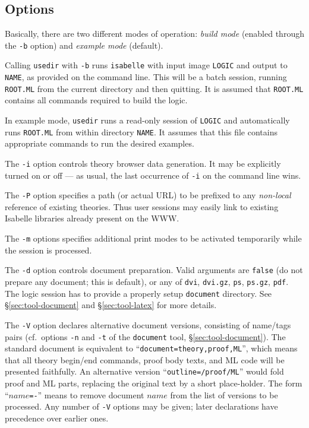 \subsection*{Options}

Basically, there are two different modes of operation: \emph{build mode}
(enabled through the \texttt{-b} option) and \emph{example mode} (default).

Calling \texttt{usedir} with \texttt{-b} runs \texttt{isabelle} with input
image \texttt{LOGIC} and output to \texttt{NAME}, as provided on the command
line. This will be a batch session, running \texttt{ROOT.ML} from the current
directory and then quitting.  It is assumed that \texttt{ROOT.ML} contains all
{\ML} commands required to build the logic.

In example mode, \texttt{usedir} runs a read-only session of \texttt{LOGIC}
and automatically runs \texttt{ROOT.ML} from within directory \texttt{NAME}.
It assumes that this file contains appropriate {\ML} commands to run the
desired examples.

\medskip The \texttt{-i} option controls theory browser data generation. It
may be explicitly turned on or off --- as usual, the last occurrence of
\texttt{-i} on the command line wins.

The \texttt{-P} option specifies a path (or actual URL) to be prefixed to any
\emph{non-local} reference of existing theories.  Thus user sessions may
easily link to existing Isabelle libraries already present on the WWW.

The \texttt{-m} options specifies additional print modes to be activated
temporarily while the session is processed.

\medskip The \texttt{-d} option controls document preparation.  Valid
arguments are \texttt{false} (do not prepare any document; this is default),
or any of \texttt{dvi}, \texttt{dvi.gz}, \texttt{ps}, \texttt{ps.gz},
\texttt{pdf}.  The logic session has to provide a properly setup
\texttt{document} directory.  See \S\ref{sec:tool-document} and
\S\ref{sec:tool-latex} for more details.

\medskip The \texttt{-V} option declares alternative document versions,
consisting of name/tags pairs (cf.\ options \texttt{-n} and \texttt{-t} of the
\texttt{document} tool, \S\ref{sec:tool-document}).  The standard document is
equivalent to ``\texttt{document=theory,proof,ML}'', which means that all
theory begin/end commands, proof body texts, and ML code will be presented
faithfully.  An alternative version ``\texttt{outline=/proof/ML}'' would fold
proof and ML parts, replacing the original text by a short place-holder.  The
form ``$name$\verb,=-,'' means to remove document $name$ from the list of
versions to be processed.  Any number of \texttt{-V} options may be given;
later declarations have precedence over earlier ones.

